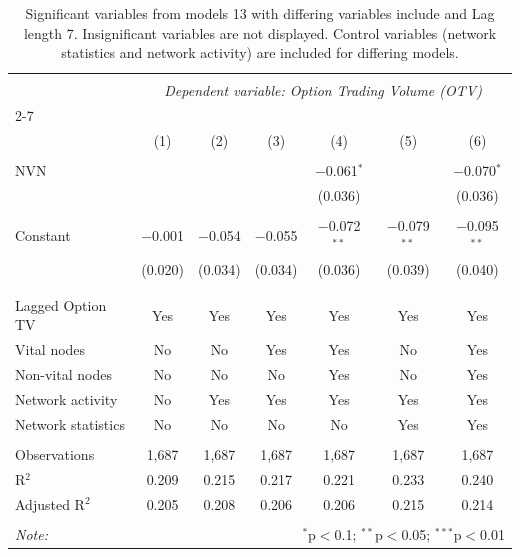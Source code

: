 
\begin{table}[!htbp] \centering 
  \caption{Significant variables from models 13 with differing variables include 
                               and Lag length 7. Insignificant variables are not displayed. 
                               Control variables (network statistics and network activity) are 
                               included for differing models.} 
  \label{opt_Volumemodels1_t} 
\scriptsize 
\begin{tabular}{@{\extracolsep{5pt}}lcccccc} 
\\[-1.8ex]\hline 
\hline \\[-1.8ex] 
 & \multicolumn{6}{c}{\textit{Dependent variable: Option Trading Volume (OTV)}} \\ 
\cline{2-7} 
\\[-1.8ex] & (1) & (2) & (3) & (4) & (5) & (6)\\ 
\hline \\[-1.8ex] 
 NVN &  &  &  & $-$0.061$^{*}$ &  & $-$0.070$^{*}$ \\ 
  &  &  &  & (0.036) &  & (0.036) \\ 
  & & & & & & \\ 
 Constant & $-$0.001 & $-$0.054 & $-$0.055 & $-$0.072$^{**}$ & $-$0.079$^{**}$ & $-$0.095$^{**}$ \\ 
  & (0.020) & (0.034) & (0.034) & (0.036) & (0.039) & (0.040) \\ 
  & & & & & & \\ 
\hline \\[-1.8ex] 
Lagged Option TV & Yes & Yes & Yes & Yes & Yes & Yes \\ 
Vital nodes & No & No & Yes & Yes & No & Yes \\ 
Non-vital nodes & No & No & No & Yes & No & Yes \\ 
Network activity & No & Yes & Yes & Yes & Yes & Yes \\ 
Network statistics & No & No & No & No & Yes & Yes \\ 
\hline &  &  &  &  &  &  \\ 
Observations & 1,687 & 1,687 & 1,687 & 1,687 & 1,687 & 1,687 \\ 
R$^{2}$ & 0.209 & 0.215 & 0.217 & 0.221 & 0.233 & 0.240 \\ 
Adjusted R$^{2}$ & 0.205 & 0.208 & 0.206 & 0.206 & 0.215 & 0.214 \\ 
\hline 
\hline \\[-1.8ex] 
\textit{Note:}  & \multicolumn{6}{r}{$^{*}$p$<$0.1; $^{**}$p$<$0.05; $^{***}$p$<$0.01} \\ 
\end{tabular} 
\end{table} 
